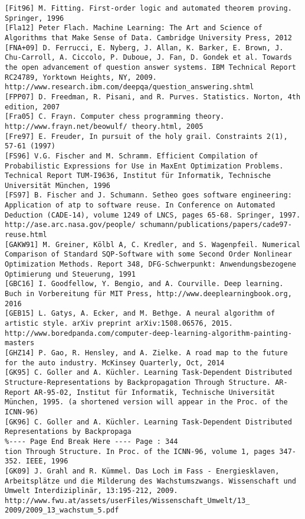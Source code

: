 \documentclass[10pt]{article}
\begin{document}
\begin{verbatim}
[Fit96] M. Fitting. First-order logic and automated theorem proving. Springer, 1996
[Fla12] Peter Flach. Machine Learning: The Art and Science of Algorithms that Make Sense of Data. Cambridge University Press, 2012
[FNA+09] D. Ferrucci, E. Nyberg, J. Allan, K. Barker, E. Brown, J. Chu-Carroll, A. Ciccolo, P. Duboue, J. Fan, D. Gondek et al. Towards the open advancement of question answer systems. IBM Technical Report RC24789, Yorktown Heights, NY, 2009. http://www.research.ibm.com/deepqa/question_answering.shtml
[FPP07] D. Freedman, R. Pisani, and R. Purves. Statistics. Norton, 4th edition, 2007
[Fra05] C. Frayn. Computer chess programming theory. http://www.frayn.net/beowulf/ theory.html, 2005
[Fre97] E. Freuder, In pursuit of the holy grail. Constraints 2(1), 57-61 (1997)
[FS96] V.G. Fischer and M. Schramm. Efficient Compilation of Probabilistic Expressions for Use in MaxEnt Optimization Problems. Technical Report TUM-I9636, Institut für Informatik, Technische Universität München, 1996
[FS97] B. Fischer and J. Schumann. Setheo goes software engineering: Application of atp to software reuse. In Conference on Automated Deduction (CADE-14), volume 1249 of LNCS, pages 65-68. Springer, 1997. http://ase.arc.nasa.gov/people/ schumann/publications/papers/cade97-reuse.html
[GAKW91] M. Greiner, Kölbl A, C. Kredler, and S. Wagenpfeil. Numerical Comparison of Standard SQP-Software with some Second Order Nonlinear Optimization Methods. Report 348, DFG-Schwerpunkt: Anwendungsbezogene Optimierung und Steuerung, 1991
[GBC16] I. Goodfellow, Y. Bengio, and A. Courville. Deep learning. Buch in Vorbereitung für MIT Press, http://www.deeplearningbook.org, 2016
[GEB15] L. Gatys, A. Ecker, and M. Bethge. A neural algorithm of artistic style. arXiv preprint arXiv:1508.06576, 2015. http://www.boredpanda.com/computer-deep-learning-algorithm-painting-masters
[GHZ14] P. Gao, R. Hensley, and A. Zielke. A road map to the future for the auto industry. McKinsey Quarterly, Oct, 2014
[GK95] C. Goller and A. Küchler. Learning Task-Dependent Distributed Structure-Representations by Backpropagation Through Structure. AR-Report AR-95-02, Institut für Informatik, Technische Universität München, 1995. (a shortened version will appear in the Proc. of the ICNN-96)
[GK96] C. Goller and A. Küchler. Learning Task-Dependent Distributed Representations by Backpropaga
%---- Page End Break Here ---- Page : 344
tion Through Structure. In Proc. of the ICNN-96, volume 1, pages 347-352. IEEE, 1996
[GK09] J. Grahl and R. Kümmel. Das Loch im Fass - Energiesklaven, Arbeitsplätze und die Milderung des Wachstumszwangs. Wissenschaft und Umwelt Interdiziplinär, 13:195-212, 2009. http://www.fwu.at/assets/userFiles/Wissenschaft_Umwelt/13_ 2009/2009_13_wachstum_5.pdf

\end{verbatim}
\end{document}
